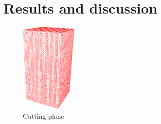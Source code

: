 \section{Results and discussion}
\begin{figure}[h]
    \centering
    \includegraphics[width=0.25\textwidth]{../figures/heatsink8_h205_gmf005_mesh.png}
    \caption{Cutting plane}
    \label{fig:heatsink4_h105_gmf005}
\end{figure}

